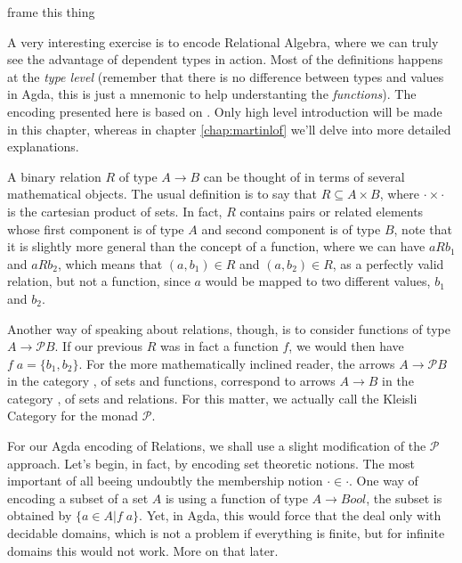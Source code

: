 \begin{TODO}
  \item frame this thing
\end{TODO}

A very interesting exercise is to encode Relational Algebra\cite{Bird97}, where
we can truly see the advantage of dependent types in action. Most of the definitions
happens at the \emph{type level} (remember that there is no difference between types and values in Agda,
this is just a mnemonic to help understanting the \emph{functions}). The encoding presented
here is based on \cite{Jansson09}. Only high level introduction will be made in this chapter, whereas
in chapter \ref{chap:martinlof} we'll delve into more detailed explanations.

A binary relation $R$ of type $A \rightarrow B$ can be thought of in terms of several mathematical objects.
The usual definition is to say that $R \subseteq A \times B$, where $\cdot\times\cdot$ is the cartesian product of sets.
In fact, $R$ contains pairs or related elements whose first component is of type $A$ and second component is of type $B$,
note that it is slightly more general than the concept of a function, where we can have $a R b_1$ and $a R b_2$, which means
that $(a, b_1) \in R$ and $(a, b_2) \in R$, as a perfectly valid relation, but not a function, since $a$ would be mapped to two different values, $b_1$ and $b_2$.

\newcommand{\powerset}{\mathcal{P}}
Another way of speaking about relations, though, is to consider functions of type $A \rightarrow \powerset B$.
If our previous $R$ was in fact a function $f$, we would then have $f\; a = \{b_1, b_2\}$. For the more
mathematically inclined reader, the arrows $A \rightarrow \powerset B$ in the category , of sets and
functions, correspond to arrows $A \rightarrow B$ in the category , of sets and relations. For this matter,
we actually call  the Kleisli Category for the monad $\powerset$. 

For our Agda encoding of Relations, we shall use a slight modification of the $\powerset$ approach.
Let's begin, in fact, by encoding set theoretic notions. The most important of all beeing undoubtly
the membership notion $\cdot \in \cdot$. One way of encoding a subset of a set $A$ is using a function
of type $A \rightarrow Bool$, the subset is obtained by $\{ a \in A | f\;a \}$. Yet, in Agda, this would
force that the deal only with decidable domains, which is not a problem if everything is finite, but
for infinite domains this would not work. More on that later.
